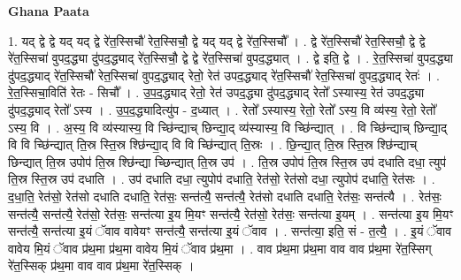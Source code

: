 \documentclass[17pt]{extarticle}
\begin{document}
\textbf{Ghana Paata } \newline

1. यद् द्वे द्वे यद् यद् द्वे रे॑त॒स्सिचौ॑ रेत॒स्सिचौ॒ द्वे यद् यद् द्वे रे॑त॒स्सिचौ᳚ । . द्वे रे॑त॒स्सिचौ॑ रेत॒स्सिचौ॒ द्वे द्वे रे॑त॒स्सिचा॑ वुपद॒द्ध्या दु॑पद॒द्ध्याद् रे॑त॒स्सिचौ॒ द्वे द्वे रे॑त॒स्सिचा॑ वुपद॒द्ध्यात् । . द्वे इति॒ द्वे । . रे॒त॒स्सिचा॑ वुपद॒द्ध्या दु॑पद॒द्ध्याद् रे॑त॒स्सिचौ॑ रेत॒स्सिचा॑ वुपद॒द्ध्याद् रेतो॒ रेत॑ उपद॒द्ध्याद् रे॑त॒स्सिचौ॑ रेत॒स्सिचा॑ वुपद॒द्ध्याद् रेतः॑ । . रे॒त॒स्सिचा॒विति॑ रेतः - सिचौ᳚ । . उ॒प॒द॒द्ध्याद् रेतो॒ रेत॑ उपद॒द्ध्या दु॑पद॒द्ध्याद् रेतो᳚ ऽस्यास्य॒ रेत॑ उपद॒द्ध्या दु॑पद॒द्ध्याद् रेतो᳚ ऽस्य । . उ॒प॒द॒द्ध्यादित्यु॑प - द॒ध्यात् । . रेतो᳚ ऽस्यास्य॒ रेतो॒ रेतो᳚ ऽस्य॒ वि व्य॑स्य॒ रेतो॒ रेतो᳚ ऽस्य॒ वि । . अ॒स्य॒ वि व्य॑स्यास्य॒ वि च्छि॑न्द्याच् छिन्द्या॒द् व्य॑स्यास्य॒ वि च्छि॑न्द्यात् । . वि च्छि॑न्द्याच् छिन्द्या॒द् वि वि च्छि॑न्द्यात् ति॒स्र स्ति॒स्र श्छि॑न्द्या॒द् वि वि च्छि॑न्द्यात् ति॒स्रः । . छि॒न्द्या॒त् ति॒स्र स्ति॒स्र श्छि॑न्द्याच् छिन्द्यात् ति॒स्र उपोप॑ ति॒स्र श्छि॑न्द्या च्छिन्द्यात् ति॒स्र उप॑ । . ति॒स्र उपोप॑ ति॒स्र स्ति॒स्र उप॑ दधाति दधा॒ त्युप॑ ति॒स्र स्ति॒स्र उप॑ दधाति । . उप॑ दधाति दधा॒ त्युपोप॑ दधाति॒ रेत॑सो॒ रेत॑सो दधा॒ त्युपोप॑ दधाति॒ रेत॑सः । . द॒धा॒ति॒ रेत॑सो॒ रेत॑सो दधाति दधाति॒ रेत॑सः॒ सन्त॑त्यै॒ सन्त॑त्यै॒ रेत॑सो दधाति दधाति॒ रेत॑सः॒ सन्त॑त्यै । . रेत॑सः॒ सन्त॑त्यै॒ सन्त॑त्यै॒ रेत॑सो॒ रेत॑सः॒ सन्त॑त्या इ॒य मि॒यꣳ सन्त॑त्यै॒ रेत॑सो॒ रेत॑सः॒ सन्त॑त्या इ॒यम् । . सन्त॑त्या इ॒य मि॒यꣳ सन्त॑त्यै॒ सन्त॑त्या इ॒यं ॅवाव वावेयꣳ सन्त॑त्यै॒ सन्त॑त्या इ॒यं ॅवाव । . सन्त॑त्या॒ इति॒ सं - त॒त्यै॒ । . इ॒यं ॅवाव वावेय मि॒यं ॅवाव प्र॑थ॒मा प्र॑थ॒मा वावेय मि॒यं ॅवाव प्र॑थ॒मा । . वाव प्र॑थ॒मा प्र॑थ॒मा वाव वाव प्र॑थ॒मा रे॑त॒स्सिग् रे॑त॒स्सिक् प्र॑थ॒मा वाव वाव प्र॑थ॒मा रे॑त॒स्सिक् । \newline
\end{document}
